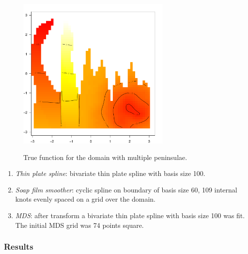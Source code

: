 \begin{figure}
\centering
\includegraphics[width=3in]{mds/figs/wt2-truth.pdf} \\
\caption{True function for the domain with multiple peninsulae.}
\label{wt2-truth}
\end{figure}

\begin{enumerate}
\item \emph{Thin plate spline}: bivariate thin plate spline with basis size 100. 
\item \emph{Soap film smoother}: cyclic spline on boundary of basis size 60, 109 internal knots evenly spaced on a grid over the domain.
\item \emph{MDS}: after transform a bivariate thin plate spline with basis size 100 was fit. The initial MDS grid was 74 points square.
\end{enumerate} 

\subsubsection{Results}

